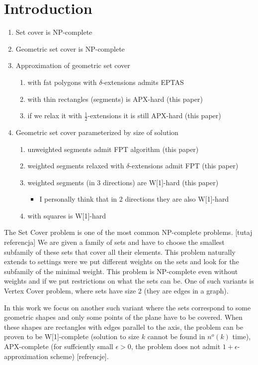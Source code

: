 \chapter{Introduction}

\begin{enumerate}
\item Set cover is NP-complete
\item Geometric set cover is NP-complete
\item Approximation of geometric set cover
	\begin{enumerate}
		\item with fat polygons with $\delta$-extensions admits EPTAS
		\item with thin rectangles (segments) is APX-hard (this paper)
		\item if we relax it with $\frac{1}{2}$-extensions it is still APX-hard (this paper)
	\end{enumerate}
\item Geometric set cover parameterized by size of solution
	\begin{enumerate}
		\item unweighted segments admit FPT algorithm (this paper)
		\item weighted segments relaxed with $\delta$-extensions admit FPT (this paper)
		\item weighted segments (in 3 directions) are W[1]-hard (this paper)
		\begin{itemize}
			\item I personally think that in 2 directions they are also W[1]-hard
		\end{itemize}
		\item with squares is W[1]-hard
	\end{enumerate}
\end{enumerate}

The Set Cover problem is one of the most common NP-complete problems.
[tutaj referencja]
We are given a family of sets and have to choose the smallest
subfamily of these sets that cover all their elements.
This problem naturally extends to settings
were we put different weights on the sets
and look for the subfamily of the minimal weight.
This problem is NP-complete even 
without weights and if we put
restrictions on what the sets can be.
One of such variants is Vertex Cover problem,
where sets have size 2 (they are edges in a graph).

In this work we focus on another such variant where the sets correspond
to some geometric shapes and
only some points of the plane have to be covered.
When these shapes are rectangles with edges parallel
to the axis, the problem can be proven to
be W[1]-complete (solution to size $k$ cannot be found
in $n^o(k)$ time),
APX-complete (for suffciently small $\epsilon > 0$, the problem
does not admit $1+\epsilon$-approximation scheme)
[refrencje].

